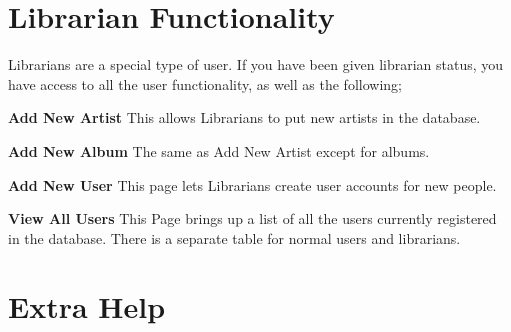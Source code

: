 \documentclass{article}
\begin{document}
\section{Librarian Functionality}
Librarians are a special type of user. If you have been given librarian status, you have access to all the user functionality, as well as the following;
\begin{description}
\item{\bf{Add New Artist}}
This allows Librarians to put new artists in the database.
\item{\bf{Add New Album}}
The same as Add New Artist except for albums.
\item{\bf{Add New User}}
This page lets Librarians create user accounts for new people.
\item{\bf{View All Users}}
This Page brings up a list of all the users currently registered in the database. There is a separate table for normal users and librarians.
\end{description}
\section{Extra Help}
\end{document}
